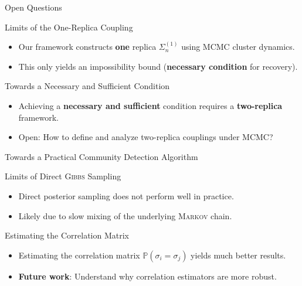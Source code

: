 \documentclass[A4,svgnames,9pt,aspectratio=169]{beamer}
\begin{document}
\begin{frame}{Open Questions}
  \begin{block}{Limits of the One-Replica Coupling}
    \begin{itemize}
      \item Our framework constructs \textbf{one} replica $\Sigma_n^{(1)}$ using MCMC cluster dynamics.
      \item This only yields an impossibility bound (\textbf{necessary condition} for recovery).
    \end{itemize}
  \end{block}
  
  \begin{block}{Towards a Necessary and Sufficient Condition}
    \begin{itemize}
      \item Achieving a \textbf{necessary and sufficient} condition requires a \textbf{two-replica} framework.
      \item Open: How to define and analyze two-replica couplings under MCMC?
    \end{itemize}
  \end{block}
\end{frame}

\begin{frame}{Towards a Practical Community Detection Algorithm}
  \begin{block}{Limits of Direct \textsc{Gibbs} Sampling}
    \begin{itemize}
      \item Direct posterior sampling does not perform well in practice.
      \item Likely due to slow mixing of the underlying \textsc{Markov} chain.
    \end{itemize}
  \end{block}

  \begin{block}{Estimating the Correlation Matrix}
    \begin{itemize}
      \item Estimating the correlation matrix $\mathbb{P}(\sigma_i = \sigma_j)$ yields much better results.
      \item \textbf{Future work}: Understand why correlation estimators are more robust.
    \end{itemize}
  \end{block}
\end{frame}
\end{document}
